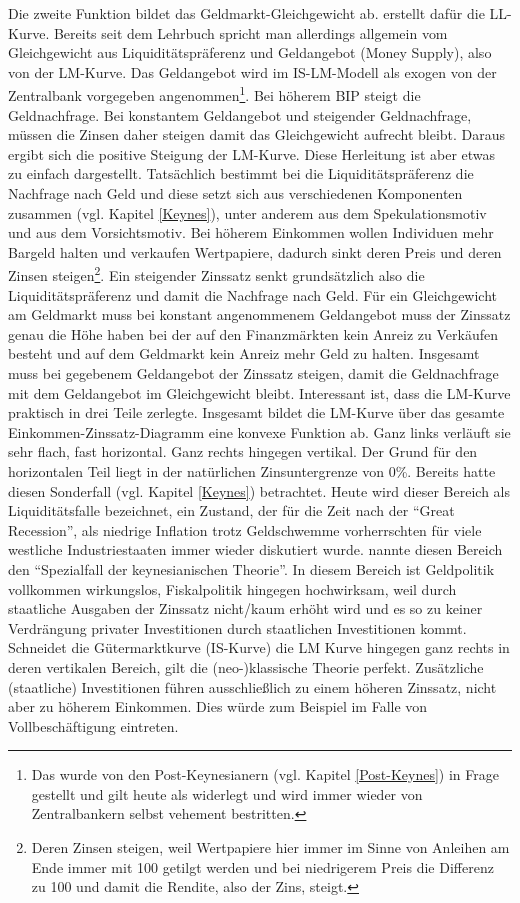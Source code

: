Die zweite Funktion bildet das Geldmarkt-Gleichgewicht ab. \textcite{Hicks1937} erstellt dafür die LL-Kurve. Bereits seit dem Lehrbuch \textcite{Samuelson1998} spricht man allerdings allgemein vom Gleichgewicht aus Liquiditätspräferenz und Geldangebot (Money Supply), also von der LM-Kurve. Das Geldangebot wird im IS-LM-Modell als exogen von der Zentralbank vorgegeben angenommen\footnote{Das wurde von den Post-Keynesianern (vgl. Kapitel \ref{Post-Keynes}) in Frage gestellt und gilt heute als widerlegt und wird immer wieder von Zentralbankern selbst vehement bestritten.}. Bei höherem BIP steigt die Geldnachfrage. Bei konstantem Geldangebot und steigender Geldnachfrage, müssen die Zinsen daher steigen damit das Gleichgewicht aufrecht bleibt. Daraus ergibt sich die positive Steigung der LM-Kurve. Diese Herleitung ist aber etwas zu einfach dargestellt. Tatsächlich bestimmt bei \textcite{Keynes1936} die Liquiditätspräferenz die Nachfrage nach Geld und diese setzt sich aus verschiedenen Komponenten zusammen (vgl. Kapitel \ref{Keynes}), unter anderem aus dem Spekulationsmotiv und aus dem Vorsichtsmotiv. Bei höherem Einkommen wollen Individuen mehr Bargeld halten und verkaufen Wertpapiere, dadurch sinkt deren Preis und deren Zinsen steigen\footnote{Deren Zinsen steigen, weil Wertpapiere hier immer im Sinne von Anleihen am Ende immer mit 100 getilgt werden und bei niedrigerem Preis die Differenz zu 100 und damit die Rendite, also der Zins, steigt.}. Ein steigender Zinssatz senkt grundsätzlich also die Liquiditätspräferenz und damit die Nachfrage nach Geld. Für ein Gleichgewicht am Geldmarkt muss bei konstant angenommenem Geldangebot muss der Zinssatz genau die Höhe haben bei der auf den Finanzmärkten kein Anreiz zu Verkäufen besteht und auf dem Geldmarkt kein Anreiz mehr Geld zu halten. Insgesamt muss bei gegebenem Geldangebot der Zinssatz steigen, damit die Geldnachfrage mit dem Geldangebot im Gleichgewicht bleibt.
Interessant ist, dass \textcite[S. 154]{Hicks1937} die LM-Kurve praktisch in drei Teile zerlegte. Insgesamt bildet die LM-Kurve über das gesamte Einkommen-Zinssatz-Diagramm eine konvexe Funktion ab. Ganz links verläuft sie sehr flach, fast horizontal. Ganz rechts hingegen vertikal. Der Grund für den horizontalen Teil liegt in der natürlichen Zinsuntergrenze von 0\%. Bereits \textcite{Keynes1936} hatte diesen Sonderfall (vgl. Kapitel \ref{Keynes}) betrachtet. Heute wird dieser Bereich als Liquiditätsfalle bezeichnet, ein Zustand, der für die Zeit nach der "`Great Recession"', als niedrige Inflation trotz Geldschwemme vorherrschten für viele westliche Industriestaaten immer wieder diskutiert wurde. \textcite[S. 154]{Hicks1937} nannte diesen Bereich den "`Spezialfall der keynesianischen Theorie"'. In diesem Bereich ist Geldpolitik vollkommen wirkungslos, Fiskalpolitik hingegen hochwirksam, weil durch staatliche Ausgaben der Zinssatz nicht/kaum erhöht wird und es so zu keiner Verdrängung privater Investitionen durch staatlichen Investitionen kommt. Schneidet die Gütermarktkurve (IS-Kurve) die LM Kurve hingegen ganz rechts in deren vertikalen Bereich, gilt die (neo-)klassische Theorie perfekt. Zusätzliche (staatliche) Investitionen führen ausschließlich zu einem höheren Zinssatz, nicht aber zu höherem Einkommen. Dies würde zum Beispiel im Falle von Vollbeschäftigung eintreten.

